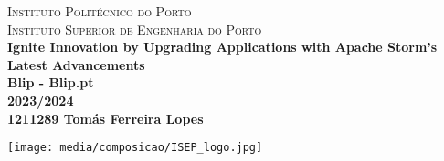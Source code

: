 \begin{titlepage}

    \center 

    \textsc{
        Instituto Politécnico do Porto\\[3mm]
        \LARGE Instituto Superior de Engenharia do Porto
    }
    \HRuleFront
    \\[4cm]

    {\huge \bfseries Ignite Innovation by Upgrading Applications with Apache Storm's Latest Advancements}\\[.5cm]

    {\bfseries Blip - Blip.pt }\\[1cm]
    {\Large \bfseries 2023/2024}\\[2cm]

    {\Large\bf 1211289 Tomás Ferreira Lopes}


    \vfill

    \texttt{[image: media/composicao/ISEP\_logo.jpg]}\\

\end{titlepage}
